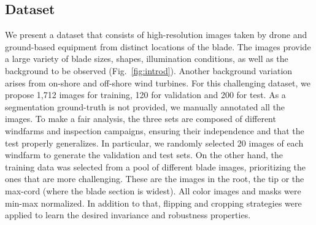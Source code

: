 

\vspace{-0.5cm}
\subsection{Dataset} \label{sec:data} 
\vspace{-0.1cm}

We present a dataset that consists of high-resolution images taken by drone and ground-based equipment from distinct locations of the blade. The images provide a large variety of blade sizes, shapes, illumination conditions, as well as the background to be observed (Fig.~\ref{fig:introd}). Another background variation arises from on-shore and off-shore wind turbines. For this challenging dataset, we propose 1,712 images for training, 120 for validation and 200 for test. As a segmentation ground-truth is not provided, we manually annotated all the images. To make a fair analysis, the three sets are composed of different windfarms and inspection campaigns, ensuring their independence and that the test properly generalizes. In particular, we randomly selected 20 images of each windfarm to generate the validation and test sets. On the other hand, the training data was selected from a pool of different blade images, prioritizing the ones that are more challenging. These are the images in the root, the tip or the max-cord (where the blade section is widest). All color images and masks were min-max normalized. In addition to that, flipping and cropping strategies were applied to learn the desired invariance and robustness properties.




